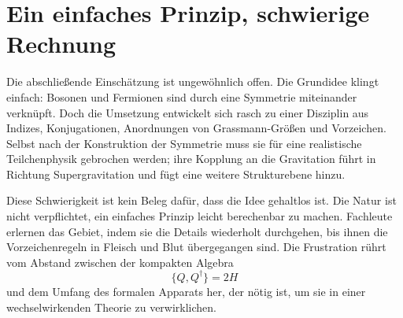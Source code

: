 \section{Ein einfaches Prinzip, schwierige Rechnung}

Die abschließende Einschätzung ist ungewöhnlich offen. Die Grundidee klingt einfach: Bosonen und Fermionen sind durch eine Symmetrie miteinander verknüpft. Doch die Umsetzung entwickelt sich rasch zu einer Disziplin aus Indizes, Konjugationen, Anordnungen von Grassmann-Größen und Vorzeichen. Selbst nach der Konstruktion der Symmetrie muss sie für eine realistische Teilchenphysik gebrochen werden; ihre Kopplung an die Gravitation führt in Richtung Supergravitation und fügt eine weitere Strukturebene hinzu.

Diese Schwierigkeit ist kein Beleg dafür, dass die Idee gehaltlos ist. Die Natur ist nicht verpflichtet, ein einfaches Prinzip leicht berechenbar zu machen. Fachleute erlernen das Gebiet, indem sie die Details wiederholt durchgehen, bis ihnen die Vorzeichenregeln in Fleisch und Blut übergegangen sind. Die Frustration rührt vom Abstand zwischen der kompakten Algebra
\begin{equation}
\{Q,Q^\dagger\}=2H
\end{equation}
und dem Umfang des formalen Apparats her, der nötig ist, um sie in einer wechselwirkenden Theorie zu verwirklichen.

\begin{classroomqa}
\end{classroomqa}

\begin{classroomqa}
\end{classroomqa}

